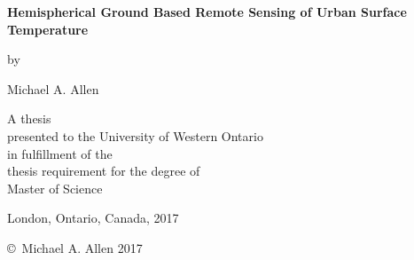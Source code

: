 \pagestyle{empty}

\begin{titlepage}
        \begin{center}
        \vspace*{1.0cm}

        \Huge
        {\bf Hemispherical Ground Based Remote Sensing of Urban Surface Temperature}

        \vspace*{1.0cm}

        \normalsize
        by \\

        \vspace*{1.0cm}

        \Large
        Michael A. Allen \\
        
        \vspace*{3.0cm}

        \normalsize
        A thesis \\
        presented to the University of Western Ontario\\ 
        in fulfillment of the \\
        thesis requirement for the degree of \\
        Master of Science \\

        \vspace*{2.0cm}

        London, Ontario, Canada, 2017 \\

        \vspace*{1.0cm}

        \copyright\ Michael A. Allen 2017 \\
        \end{center}
\end{titlepage}

